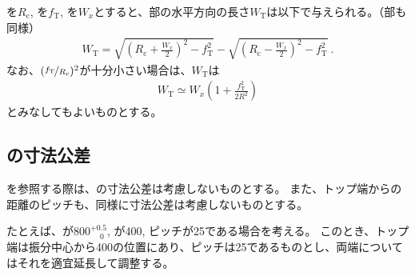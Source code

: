 \clearpage
\nameCenterCurvatureRadius を$R_\mathrm c$, \TopAlocationLength を$f_\mathrm T$, \ACOD を$W_x$とすると、\TopEndFace 部の水平方向の長さ$W_\mathrm T$は以下で与えられる。（\BottomEndFace 部も同様）
\begin{align*}
  W_\mathrm T
  = \sqrt{\left(R_\mathrm c+\frac{W_x}2\right)^2-f_\mathrm T^2}
    -\sqrt{\left(R_\mathrm c-\frac{W_x}2\right)^2-f_\mathrm T^2}\ .
\end{align*}
なお、$(\nicefrac{f_\mathrm T}{R_\mathrm c})^2$が十分小さい場合は、$W_\mathrm T$は
\begin{align*}
  W_\mathrm T \simeq W_x\left(1+\frac{f_\mathrm T^2}{2R^2}\right)
\end{align*}
とみなしてもよいものとする。




\subsection{\nameIDTaperTable の寸法公差}
\IDTaperTable を参照する際は、\nameWorkTotalLength の寸法公差は考慮しないものとする。
また、トップ端からの距離のピッチも、同様に寸法公差は考慮しないものとする。
\begin{hosoku}
たとえば、\WorkTotalLength が$800^{+0.5}_{\phantom -0}$, \TopAlocationLength が400, ピッチが25である場合を考える。
このとき、トップ端は振分中心から400の位置にあり、ピッチは25であるものとし、両端についてはそれを適宜延長して調整する。
\end{hosoku}

